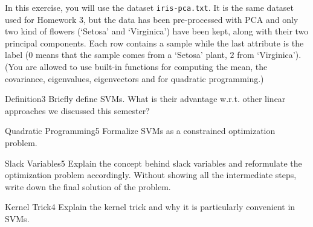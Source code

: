 \newif\ifvimbug
\vimbugfalse

\ifvimbug

\fi

In this exercise, you will use the dataset \texttt{iris-pca.txt}. It is the same dataset used for Homework 3, but the data has been pre-processed with PCA and only two kind of flowers (`Setosa' and `Virginica') have been kept, along with their two principal components. Each row contains a sample while the last attribute is the label ($0$ means that the sample comes from a `Setosa' plant, $2$ from `Virginica').
(You are allowed to use built-in functions for computing the mean, the covariance, eigenvalues, eigenvectors and for quadratic programming.)
\begin{questions}


\begin{question}{Definition}{3}
Briefly define SVMs. What is their advantage w.r.t. other linear approaches we discussed this semester? 

\begin{answer}\end{answer}
\end{question}


\begin{question}{Quadratic Programming}{5}
Formalize SVMs as a constrained optimization problem.

\begin{answer}\end{answer}
\end{question}


\begin{question}{Slack Variables}{5}
Explain the concept behind slack variables and reformulate the optimization problem accordingly. Without showing all the intermediate steps, write down the final solution of the problem.

\begin{answer}\end{answer}
\end{question}


\begin{question}{Kernel Trick}{4}
Explain the kernel trick and why it is particularly convenient in SVMs.


\end{question}
\end{questions}
